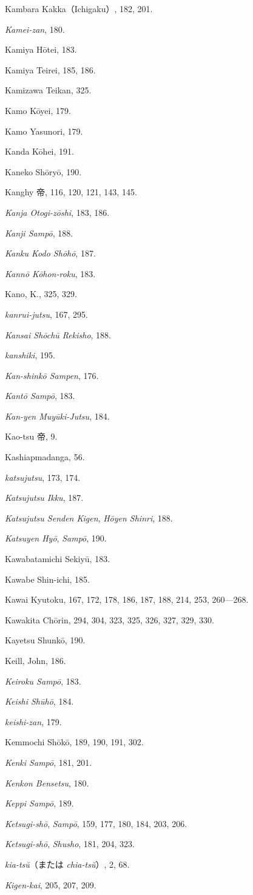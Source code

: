 \documentclass[11pt]{article}
\begin{document}
Kambara Kakka（Ichigaku）, 182, 201.\par
\emph{Kamei-zan}, 180.\par
Kamiya Hōtei, 183.\par
Kamiya Teirei, 185, 186.\par
Kamizawa Teikan, 325.\par
Kamo Kōyei, 179.\par
Kamo Yasunori, 179.\par
Kanda Kōhei, 191.\par
Kaneko Shōryō, 190.\par
Kanghy 帝, 116, 120, 121, 143, 145.\par
\emph{Kanja Otogi-zōshi}, 183, 186.\par
\emph{Kanji Sampō}, 188.\par
\emph{Kanku Kodo Shōhō}, 187.\par
\emph{Kannō Kōhon-roku}, 183.\par
Kano, K., 325, 329.\par
\emph{kanrui-jutsu}, 167, 295.\par
\emph{Kansai Shōchū Rekisho}, 188.\par
\emph{kanshiki}, 195.\par
\emph{Kan-shinkō Sampen}, 176.\par
\emph{Kantō Sampō}, 183.\par
\emph{Kan-yen Muyūki-Jutsu}, 184.\par
Kao-tsu 帝, 9.\par
Kashiapmadanga, 56.\par
\emph{katsujutsu}, 173, 174.\par
\emph{Katsujutsu Ikku}, 187.\par
\emph{Katsujutsu Senden Kigen}, \emph{Hōyen Shinri}, 188.\par
\emph{Katsuyen Hyō}, \emph{Sampō}, 190.\par
Kawabatamichi Sekiyū, 183.\par
Kawabe Shin-ichi, 185.\par
Kawai Kyutoku, 167, 172, 178, 186, 187, 188, 214, 253, 260---268.\par
Kawakita Chōrin, 294, 304, 323, 325, 326, 327, 329, 330.\par
Kayetsu Shunkō, 190.\par
Keill, John, 186.\par
\emph{Keiroku Sampō}, 183.\par
\emph{Keishi Shūhō}, 184.\par
\emph{keishi-zan}, 179.\par
Kemmochi Shōkō, 189, 190, 191, 302.\par
\emph{Kenki Sampō}, 181, 201.\par
\emph{Kenkon Bensetsu}, 180.\par
\emph{Keppi Sampō}, 189.\par
\emph{Ketsugi-shō}, \emph{Sampō}, 159, 177, 180, 184, 203, 206.\par
\emph{Ketsugi-shō}, \emph{Shusho}, 181, 204, 323.\par
\emph{kia-tsŭ}（または \emph{chia-tsŭ}）, 2, 68.\par
\emph{Kigen-kai}, 205, 207, 209.\par
\end{document}

